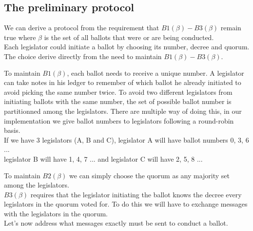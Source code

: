 \documentclass{article}
\begin{document}
\pagebreak
\subsection{The preliminary protocol}
We can derive a protocol from the requirement that $B1(\beta)-B3(\beta)$ remain true where $\beta$ is the set of all ballots that were or are being conducted.\\
Each legislator could initiate a ballot by choosing its number, decree and quorum. The choice derive directly from the need to maintain $B1(\beta)-B3(\beta)$.

To maintain $B1(\beta)$, each ballot needs to receive a unique number. A legislator can take notes in his ledger to remember of which ballot he already initiated to avoid picking the same number twice. To avoid two different legislators from initiating ballots with the same number, the set of possible ballot number is partitionned among the legislators. There are multiple way of doing this, in our implementation we give ballot numbers to legislators following a round-robin basis.\\
If we have 3 legislators (A, B and C), legislator A will have ballot numbers 0, 3, 6 ...\\
legislator B will have 1, 4, 7 ... and legislator C will have 2, 5, 8 ...

To maintain $B2(\beta)$ we can simply choose the quorum as any majority set among the legislators.\\

$B3(\beta)$ requires that the legislator initiating the ballot knows the decree every legislators in the quorum voted for. To do this we will have to exchange messages with the legislators in the quorum.\\
Let's now address what messages exactly must be sent to conduct a ballot.
\end{document}
